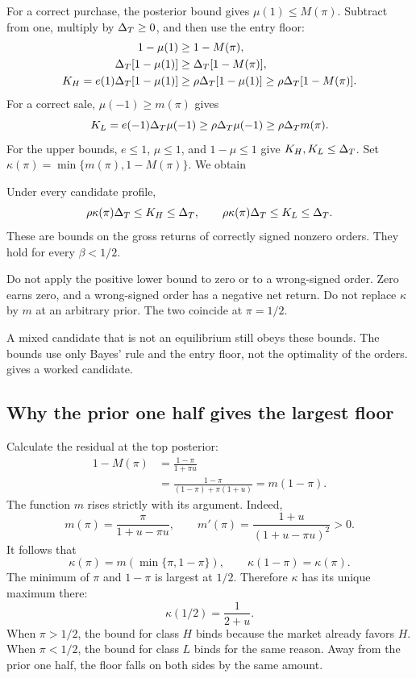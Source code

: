 For a correct purchase, the posterior bound gives $\mu(1)\le M(\pi)$.
Subtract from one, multiply by $\Delta_T\ge0$, and then use the entry floor:
\begin{align*}
1-\mu(1)&\ge1-M(\pi),\\
\Delta_T[1-\mu(1)]&\ge\Delta_T[1-M(\pi)],\\
K_H=e(1)\Delta_T[1-\mu(1)]&\ge\rho\Delta_T[1-\mu(1)]
\ge\rho\Delta_T[1-M(\pi)].
\end{align*}
For a correct sale, $\mu(-1)\ge m(\pi)$ gives
\[
K_L=e(-1)\Delta_T\mu(-1)\ge\rho\Delta_T\mu(-1)\ge\rho\Delta_T m(\pi).
\]
For the upper bounds, $e\le1$, $\mu\le1$, and $1-\mu\le1$ give $K_H,K_L\le\Delta_T$.
Set $\kappa(\pi)=\min\{m(\pi),1-M(\pi)\}$.
We obtain
\begin{resultbox}
Under every candidate profile,
\[
\rho\kappa(\pi)\Delta_T\le K_H\le\Delta_T,\qquad
\rho\kappa(\pi)\Delta_T\le K_L\le\Delta_T.
\]
These are bounds on the gross returns of correctly signed nonzero orders. 
They hold for every $\beta<1/2$.
\end{resultbox}

\begin{caution}
Do not apply the positive lower bound to zero or to a wrong-signed order.
Zero earns zero, and a wrong-signed order has a negative net return.
Do not replace $\kappa$ by $m$ at an arbitrary prior.
The two coincide at $\pi=1/2$.
\end{caution}

A mixed candidate that is not an equilibrium still obeys these bounds.
The bounds use only Bayes' rule and the entry floor, not the optimality of the orders.
 gives a worked candidate.

\subsection{Why the prior one half gives the largest floor}
\label{sec:05_investor-prior}

Calculate the residual at the top posterior:
\begin{align*}
1-M(\pi)
&=\frac{1-\pi}{1+\pi u}\\
&=\frac{1-\pi}{(1-\pi)+\pi(1+u)}=m(1-\pi).
\end{align*}
The function $m$ rises strictly with its argument.
Indeed,
\[
m(\pi)=\frac{\pi}{1+u-\pi u},\qquad
m'(\pi)=\frac{1+u}{(1+u-\pi u)^2}>0.
\]
It follows that
\[
\kappa(\pi)=m(\min\{\pi,1-\pi\}),\qquad
\kappa(1-\pi)=\kappa(\pi).
\]
The minimum of $\pi$ and $1-\pi$ is largest at $1/2$.
Therefore $\kappa$ has its unique maximum there:
\[
\kappa(1/2)=\frac1{2+u}.
\]
When $\pi>1/2$, the bound for class $H$ binds because the market already favors $H$.
When $\pi<1/2$, the bound for class $L$ binds for the same reason.
Away from the prior one half, the floor falls on both sides by the same amount.

